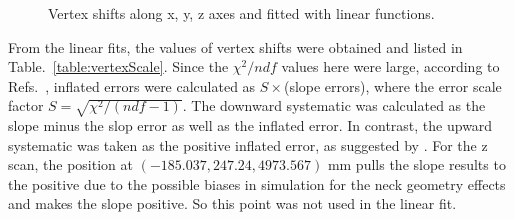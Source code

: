 \begin{figure}
	\centering
	\caption{Vertex shifts along x, y, z axes and fitted with linear functions.}
	\label{fig:vertexScale}
\end{figure}

From the linear fits, the values of vertex shifts were obtained and listed in Table.~\ref{table:vertexScale}. Since the $\chi^2/ndf$ values here were large, according to Refs.~\cite{waterunidoc,pdg2020}, inflated errors were calculated as $S\times$(slope errors), where the error scale factor $S=\sqrt{\chi^2/(ndf-1)}$. The downward systematic was calculated as the slope minus the slop error as well as the inflated error. In contrast, the upward systematic was taken as the positive inflated error, as suggested by \cite{waterunidoc}. For the z scan, the position at $(-185.037,247.24,4973.567)$ mm pulls the slope results to the positive due to the possible biases in simulation for the neck geometry effects and makes the slope positive. So this point was not used in the linear fit.


